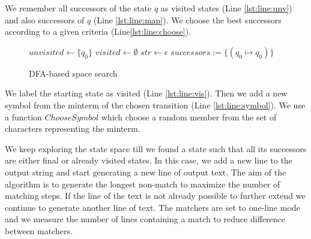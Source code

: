 \documentclass[acmsmall,screen]{acmart}
\begin{document}
%
We remember all successors of the state $q$ as visited states (Line \ref{lst:line:unv}) and also successors of $q$ (Line \ref{lst:line:map}).
%
We choose the best successors according to a given criteria (Line\ref{lst:line:choose}). 

 \begin{figure}[t]
\begin{center}
\begin{algorithm}[H]
\caption{DFA-based space search}
\label{algo:basic}
    $unvisited \leftarrow \{q_0\}$\; \label{lst:line:initial} 
    $visited \leftarrow \emptyset$\;
    $str \leftarrow \epsilon$\;
    $successors:=\{ (q_0\mapsto q_0)\}$\;
    
      \label{ln:ret}
\end{algorithm}		
\end{center}
\vspace*{-7mm}
\end{figure}



%
We label the starting state as visited (Line \ref{lst:line:vis}).
%
Then we add a new symbol from the minterm of the chosen transition (Line \ref{lst:line:symbol}).  
%
We use a function $ChooseSymbol$ which choose a random member from the set of characters representing the minterm.

We keep exploring the state space till we found a state such that all its successors are either final or already visited states.
%
In this case, we add a new line to the output string and start generating a new line of output text.
%
The aim of the algorithm is to generate the longest non-match to maximize the number of matching steps. 
%
If the line of the text is not already possible to further extend we continue to generate another line of text.
% 
The matchers are set to one-line mode and we measure the number of lines containing a match to reduce difference between matchers.
\end{document}
